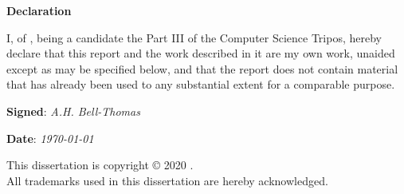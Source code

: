 \newpage
{\Huge \bf Declaration}

\vspace{24pt} 

I, \authorname of \authorcollege, being a candidate the Part III of
the Computer Science Tripos, hereby declare that this report and the
work described in it are my own work, unaided except as may be
specified below, and that the report does not contain material that
has already been used to any substantial extent for a comparable
purpose.


\vspace{60pt}
\textbf{Signed}: \textit{A.H. Bell-Thomas}

\vspace{12pt}
\textbf{Date}: \textit{\today}


\vfill

This dissertation is copyright \copyright{} 2020 \authorname. 
\\
All trademarks used in this dissertation are hereby acknowledged.



\newpage
\vspace*{\fill}
